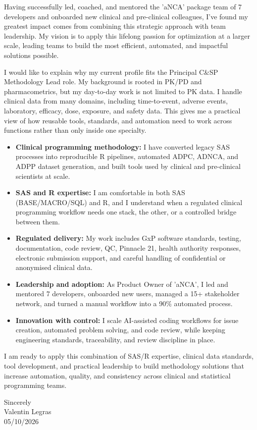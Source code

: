 \documentclass[11pt,a4paper]{article}
\newcommand{\Position}{Principal C\&SP Methodology Lead}
\newcommand{\SignDate}{05/10/2026}
\begin{document}
Having successfully led, coached, and mentored the 'aNCA' package team of 7
developers and onboarded new clinical and pre-clinical colleagues, I've found my
greatest impact comes from combining this strategic approach with team
leadership. My vision is to apply this lifelong passion for optimization at a
larger scale, leading teams to build the most efficient, automated, and impactful
solutions possible.

I would like to explain why my current profile fits the \Position{} role. My
background is rooted in PK/PD and pharmacometrics, but my day-to-day work is not
limited to PK data. I handle clinical data from many domains, including
time-to-event, adverse events, laboratory, efficacy, dose, exposure, and safety
data. This gives me a practical view of how reusable tools, standards, and
automation need to work across functions rather than only inside one specialty.

\begin{itemize}
  \item \textbf{Clinical programming methodology:} I have converted legacy SAS
        processes into reproducible R pipelines, automated ADPC, ADNCA, and ADPP
        dataset generation, and built tools used by clinical and pre-clinical
        scientists at scale.
  \item \textbf{SAS and R expertise:} I am comfortable in both SAS
        (BASE/MACRO/SQL) and R, and I understand when a regulated clinical
        programming workflow needs one stack, the other, or a controlled bridge
        between them.
  \item \textbf{Regulated delivery:} My work includes GxP software standards,
        testing, documentation, code review, QC, Pinnacle 21, health authority
        responses, electronic submission support, and careful handling of
        confidential or anonymised clinical data.
  \item \textbf{Leadership and adoption:} As Product Owner of 'aNCA', I led and
        mentored 7 developers, onboarded new users, managed a 15+ stakeholder
        network, and turned a manual workflow into a 90\% automated process.
  \item \textbf{Innovation with control:} I scale AI-assisted coding workflows
        for issue creation, automated problem solving, and code review, while
        keeping engineering standards, traceability, and review discipline in
        place.
\end{itemize}

I am ready to apply this combination of SAS/R expertise, clinical data standards,
tool development, and practical leadership to build methodology solutions that
increase automation, quality, and consistency across clinical and statistical
programming teams.

\vspace{10pt}
Sincerely\\[6pt]
Valentin Legras\\
\SignDate{}
\end{document}
